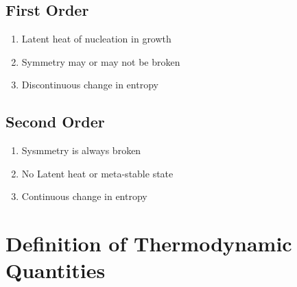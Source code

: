 	\subsection{First Order}
		\begin{enumerate}
			\item Latent heat of nucleation in growth
			\item Symmetry may or may not be broken
			\item Discontinuous change in entropy
		\end{enumerate}
	\subsection{Second Order}
		\begin{enumerate}
			\item Sysmmetry is always broken
			\item No Latent heat or meta-stable state
			\item Continuous change in entropy
		\end{enumerate}
	
\section{Definition of Thermodynamic Quantities}
